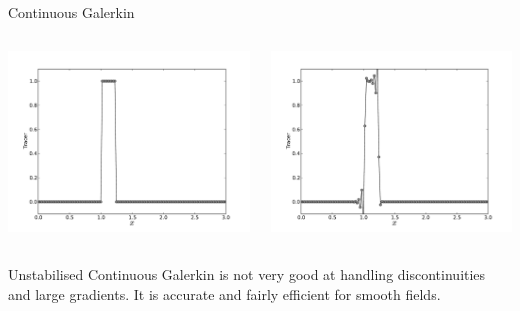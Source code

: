 \documentclass[12pt]{beamer}
\begin{document}
\begin{frame}{Continuous Galerkin}
  \begin{columns}
  \begin{column}{0.5\textwidth}
  \includegraphics[width=1\textwidth]{tophat0}
  \end{column}
  \begin{column}{0.5\textwidth}
  \includegraphics[width=1\textwidth]{tophatcg1}
  \end{column}
  \end{columns}
  Unstabilised Continuous Galerkin is not very good at handling discontinuities
  and large gradients. It is accurate and fairly efficient for smooth fields.


\end{frame}
\end{document}
